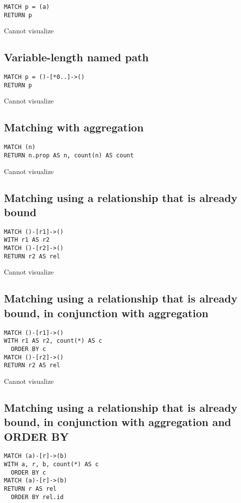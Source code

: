 \begin{lstlisting}
MATCH p = (a)
RETURN p
\end{lstlisting}

Cannot visualize
\subsection{Variable-length named path}

\begin{lstlisting}
MATCH p = ()-[*0..]->()
RETURN p
\end{lstlisting}

Cannot visualize
\subsection{Matching with aggregation}

\begin{lstlisting}
MATCH (n)
RETURN n.prop AS n, count(n) AS count
\end{lstlisting}

Cannot visualize
\subsection{Matching using a relationship that is already bound}

\begin{lstlisting}
MATCH ()-[r1]->()
WITH r1 AS r2
MATCH ()-[r2]->()
RETURN r2 AS rel
\end{lstlisting}

Cannot visualize
\subsection{Matching using a relationship that is already bound, in conjunction with aggregation}

\begin{lstlisting}
MATCH ()-[r1]->()
WITH r1 AS r2, count(*) AS c
  ORDER BY c
MATCH ()-[r2]->()
RETURN r2 AS rel
\end{lstlisting}

Cannot visualize
\subsection{Matching using a relationship that is already bound, in conjunction with aggregation and ORDER BY}

\begin{lstlisting}
MATCH (a)-[r]->(b)
WITH a, r, b, count(*) AS c
  ORDER BY c
MATCH (a)-[r]->(b)
RETURN r AS rel
  ORDER BY rel.id
\end{lstlisting}

